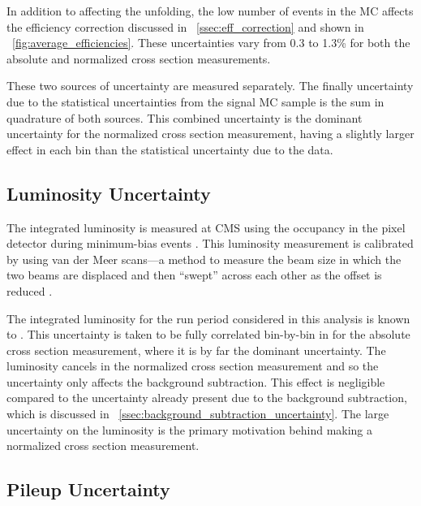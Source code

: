 In addition to affecting the unfolding, the low number of events in the MC
affects the efficiency correction discussed in \SEC~\ref{ssec:eff_correction}
and shown in \FIG~\ref{fig:average_efficiencies}. These uncertainties vary from
0.3 to 1.3\% for both the absolute and normalized cross section measurements.

These two sources of uncertainty are measured separately. The finally
uncertainty due to the statistical uncertainties from the \MADGRAPH signal MC
sample is the sum in quadrature of both sources. This combined uncertainty is
the dominant uncertainty for the normalized cross section measurement, having a
slightly larger effect in each \phistar bin than the statistical uncertainty
due to the data.

\subsection{Luminosity Uncertainty}
\label{ssec:lumi_uncertainty}

The integrated luminosity is measured at CMS using the occupancy in the
pixel detector during minimum-bias events \cite{cms_lumi_2013}. This luminosity
measurement is calibrated by using van der Meer scans---a method to measure the
beam size in which the two beams are displaced and then ``swept'' across each
other as the offset is reduced \cite{vandermeer_1968}.

The integrated luminosity for the run period considered in this analysis is
known to \LumiUncertainty. This uncertainty is taken to be fully correlated
bin-by-bin in \phistar for the absolute cross section measurement, where it is
by far the dominant uncertainty. The luminosity cancels in the normalized
cross section measurement and so the uncertainty only affects the background
subtraction. This effect is negligible compared to the uncertainty already
present due to the background subtraction, which is discussed in
\SEC~\ref{ssec:background_subtraction_uncertainty}. The large uncertainty on
the luminosity is the primary motivation behind making a normalized cross
section measurement.

\subsection{Pileup Uncertainty}
\label{ssec:pileup_uncertainty}

